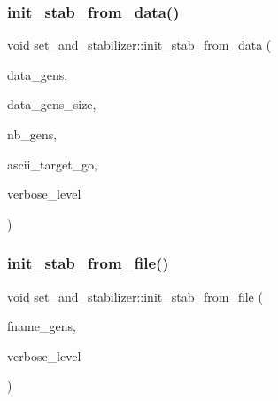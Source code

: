 \mbox{\label{classset__and__stabilizer_a535362673abcb92e323b26daf7f6042a}} 
\subsubsection{\texorpdfstring{init\+\_\+stab\+\_\+from\+\_\+data()}{init\_stab\_from\_data()}}
{\footnotesize\ttfamily void set\+\_\+and\+\_\+stabilizer\+::init\+\_\+stab\+\_\+from\+\_\+data (\begin{DoxyParamCaption}\item[{\mbox{\hyperlink{galois_8h_a09fddde158a3a20bd2dcadb609de11dc}{I\+NT}} $\ast$}]{data\+\_\+gens,  }\item[{\mbox{\hyperlink{galois_8h_a09fddde158a3a20bd2dcadb609de11dc}{I\+NT}}}]{data\+\_\+gens\+\_\+size,  }\item[{\mbox{\hyperlink{galois_8h_a09fddde158a3a20bd2dcadb609de11dc}{I\+NT}}}]{nb\+\_\+gens,  }\item[{const \mbox{\hyperlink{galois_8h_ab6cc7b4aeb6ea31aba2b3fbfc83ff5e6}{B\+Y\+TE}} $\ast$}]{ascii\+\_\+target\+\_\+go,  }\item[{\mbox{\hyperlink{galois_8h_a09fddde158a3a20bd2dcadb609de11dc}{I\+NT}}}]{verbose\+\_\+level }\end{DoxyParamCaption})}

\mbox{\label{classset__and__stabilizer_af7fa2f6348b350072e8d9278e795cdbb}} 
\subsubsection{\texorpdfstring{init\+\_\+stab\+\_\+from\+\_\+file()}{init\_stab\_from\_file()}}
{\footnotesize\ttfamily void set\+\_\+and\+\_\+stabilizer\+::init\+\_\+stab\+\_\+from\+\_\+file (\begin{DoxyParamCaption}\item[{const \mbox{\hyperlink{galois_8h_ab6cc7b4aeb6ea31aba2b3fbfc83ff5e6}{B\+Y\+TE}} $\ast$}]{fname\+\_\+gens,  }\item[{\mbox{\hyperlink{galois_8h_a09fddde158a3a20bd2dcadb609de11dc}{I\+NT}}}]{verbose\+\_\+level }\end{DoxyParamCaption})}

